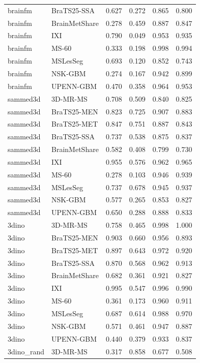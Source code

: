 \begin{tabular}{llrrrr}
brainfm & BraTS25-SSA & 0.627 & 0.272 & 0.865 & 0.800 \\
brainfm & BrainMetShare & 0.278 & 0.459 & 0.887 & 0.847 \\
brainfm & IXI & 0.790 & 0.049 & 0.953 & 0.935 \\
brainfm & MS-60 & 0.333 & 0.198 & 0.998 & 0.994 \\
brainfm & MSLesSeg & 0.693 & 0.120 & 0.852 & 0.743 \\
brainfm & NSK-GBM & 0.274 & 0.167 & 0.942 & 0.899 \\
brainfm & UPENN-GBM & 0.470 & 0.358 & 0.964 & 0.953 \\
sammed3d & 3D-MR-MS & 0.708 & 0.509 & 0.840 & 0.825 \\
sammed3d & BraTS25-MEN & 0.823 & 0.725 & 0.907 & 0.883 \\
sammed3d & BraTS25-MET & 0.847 & 0.751 & 0.887 & 0.843 \\
sammed3d & BraTS25-SSA & 0.737 & 0.538 & 0.875 & 0.837 \\
sammed3d & BrainMetShare & 0.582 & 0.408 & 0.799 & 0.730 \\
sammed3d & IXI & 0.955 & 0.576 & 0.962 & 0.965 \\
sammed3d & MS-60 & 0.278 & 0.103 & 0.946 & 0.939 \\
sammed3d & MSLesSeg & 0.737 & 0.678 & 0.945 & 0.937 \\
sammed3d & NSK-GBM & 0.577 & 0.265 & 0.853 & 0.827 \\
sammed3d & UPENN-GBM & 0.650 & 0.288 & 0.888 & 0.833 \\
3dino & 3D-MR-MS & 0.758 & 0.465 & 0.998 & 1.000 \\
3dino & BraTS25-MEN & 0.903 & 0.660 & 0.956 & 0.893 \\
3dino & BraTS25-MET & 0.897 & 0.643 & 0.972 & 0.920 \\
3dino & BraTS25-SSA & 0.870 & 0.568 & 0.962 & 0.913 \\
3dino & BrainMetShare & 0.682 & 0.361 & 0.921 & 0.827 \\
3dino & IXI & 0.995 & 0.547 & 0.996 & 0.990 \\
3dino & MS-60 & 0.361 & 0.173 & 0.960 & 0.911 \\
3dino & MSLesSeg & 0.687 & 0.614 & 0.988 & 0.970 \\
3dino & NSK-GBM & 0.571 & 0.461 & 0.947 & 0.887 \\
3dino & UPENN-GBM & 0.440 & 0.379 & 0.933 & 0.837 \\
3dino\_rand & 3D-MR-MS & 0.317 & 0.858 & 0.677 & 0.508 \\

\end{tabular}
